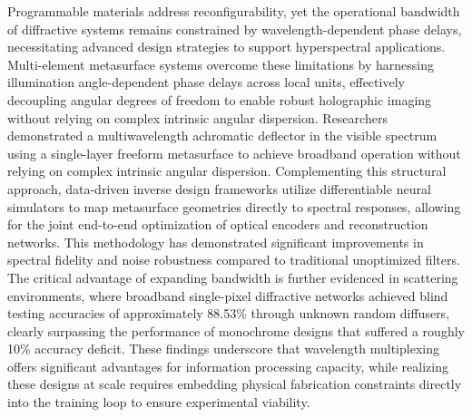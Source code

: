 Programmable materials address reconfigurability, yet the operational bandwidth of diffractive systems remains constrained by wavelength-dependent phase delays, necessitating advanced design strategies to support hyperspectral applications. Multi-element metasurface systems overcome these limitations by harnessing illumination angle-dependent phase delays across local units, effectively decoupling angular degrees of freedom to enable robust holographic imaging without relying on complex intrinsic angular dispersion. Researchers demonstrated a multiwavelength achromatic deflector in the visible spectrum using a single-layer freeform metasurface to achieve broadband operation without relying on complex intrinsic angular dispersion. \citep{doi_10_1021_acs_nanolett_4c02995_4955c826} Complementing this structural approach, data-driven inverse design frameworks utilize differentiable neural simulators to map metasurface geometries directly to spectral responses, allowing for the joint end-to-end optimization of optical encoders and reconstruction networks. This methodology has demonstrated significant improvements in spectral fidelity and noise robustness compared to traditional unoptimized filters. The critical advantage of expanding bandwidth is further evidenced in scattering environments, where broadband single-pixel diffractive networks achieved blind testing accuracies of approximately 88.53\% through unknown random diffusers, clearly surpassing the performance of monochrome designs that suffered a roughly 10\% accuracy deficit. These findings underscore that wavelength multiplexing offers significant advantages for information processing capacity, while realizing these designs at scale requires embedding physical fabrication constraints directly into the training loop to ensure experimental viability. \citep{doi_10_2528_pier25052305_11655dbe} \citep{s2_76a83ea3baed75ad88b7f0782eb9a694a330c853_cee16cac} \citep{doi_10_1038_s41377_023_01116_3_aba67a18}

